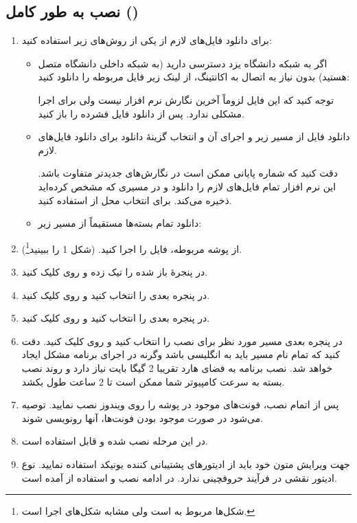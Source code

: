 \persian
\newpage 
\pagebreak
\subsection{نصب     به طور کامل (\XePersian)}
\baselineskip=1cm
\begin{enumerate}
\item برای دانلود فایل‌های لازم از یکی از روش‌های زیر استفاده کنید:
\begin{itemize}
\item اگر به شبکه دانشگاه یزد دسترسی دارید (به شبکه داخلی دانشگاه متصل هستید) بدون نیاز به اتصال
به اکانتینگ، از لینک زیر فایل مربوطه را دانلود کنید:

\centerline{}

توجه کنید که این فایل لزوماً آخرین نگارش نرم افزار نیست ولی برای اجرا مشکلی ندارد. پس از دانلود
فایل فشرده را باز کنید.

\item دانلود فایل  از مسیر زیر و اجرای آن و انتخاب گزینۀ دانلود برای دانلود فایل‌های لازم.


دقت کنید که شماره پایانی ممکن است در نگارش‌های جدیدتر متفاوت باشد.
این نرم افزار تمام فایل‌های لازم را دانلود و در مسیری که مشخص کرده‌اید ذخیره می‌کند.
برای انتخاب محل از  استفاده کنید.
\item دانلود تمام بسته‌ها مستقیماً از مسیر زیر:\\
\end{itemize}
\item   از پوشه مربوطه، فایل   را اجرا کنید.  (شکل 1 را ببینید\footnote{شکل‌ها مربوط
به  است ولی مشابه شکل‌های اجرا است. }).
\item در پنجرۀ باز شده  را تیک زده و روی  کلیک کنید.
\item \label{complete} در پنجره بعدی  را انتخاب کنید و روی  کلیک کنید.

\item  در پنجره بعدی   را انتخاب کنید و روی  کلیک کنید.
\item  در پنجره بعدی  مسیر مورد نظر برای نصب را انتخاب کنید و روی  کلیک کنید. دقت کنید که تمام نام مسیر باید به 
انگلیسی باشد وگرنه در اجرای برنامه مشکل ایجاد خواهد شد. نصب برنامه به فضای هارد تقریبا 2 گیگا بایت نیاز دارد و روند نصب
بسته به سرعت کامپیوتر شما ممکن است تا 2 ساعت طول بکشد.
\item  پس از اتمام نصب، فونت‌های موجود در پوشه  را روی ویندوز نصب نمایید.
توصیه می‌شود در صورت موجود بودن فونت‌ها، آنها رونویسی شوند.
\item در این مرحله \XePersian نصب شده و قابل استفاده است.
\item  جهت ویرایش متون خود باید از ادیتورهای پشتیبانی کننده یونیکد استفاده نمایید. نوع ادیتور نقشی در فرآیند حروفچینی ندارد. در ادامه
نصب و استفاده از  آمده است.
\end{enumerate}
